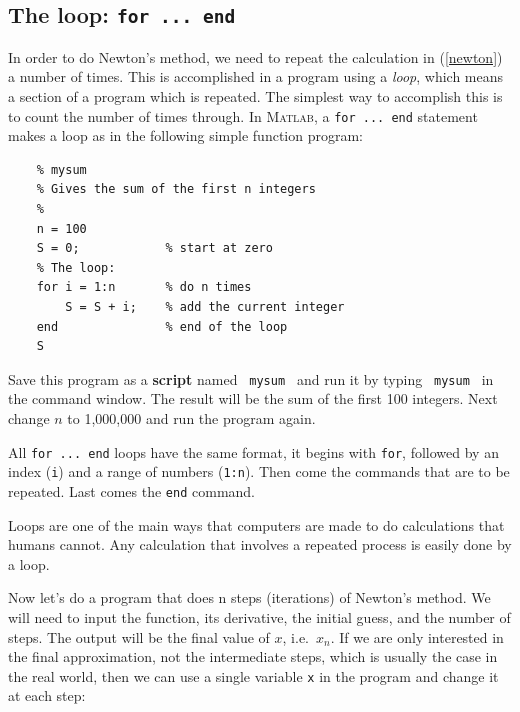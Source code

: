 
\subsection*{The loop: \texttt{for ... end}}

In order to do Newton's method, we need to repeat the
calculation in (\ref{newton}) a number of times. This
is accomplished in a program using a {\em loop}, which
means a section of a program which is repeated. The simplest
way to accomplish this is to count the number of times
through. In \textsc{Matlab}, a \verb&for ... end& statement makes a loop
as in the following simple function program:
\begin{lstlisting}
    % mysum
    % Gives the sum of the first n integers   
    %
    n = 100            
    S = 0;            % start at zero
    % The loop:
    for i = 1:n       % do n times
        S = S + i;    % add the current integer
    end               % end of the loop
    S
\end{lstlisting}

Save this program as a {\bf script} named \verb& mysum & and
run it by typing \verb& mysum & in the command window.
The result will be the sum of the first 100 integers.
Next change $n$ to 1,000,000 and run the program again.

All \verb&for ... end& loops have the same format, it begins
with \verb&for&, followed by an index (\verb&i&) and a range of numbers
(\verb&1:n&). Then
come the commands that are to be repeated. Last comes
the \verb&end& command.

Loops are one of the main ways that computers are made
to do calculations that humans cannot. Any calculation
that involves a repeated process is easily done by
a loop.

Now let's do a program that does n steps (iterations)
of Newton's method.
We will need to input the function, its derivative, the initial
guess, and the number of steps. The output will be the final
value of $x$, i.e.~$x_n$. If we are only interested in the
final approximation, not the intermediate steps, which is
usually the case in the real world, then we can use a single
variable \verb&x& in the program  and change it at each step:


